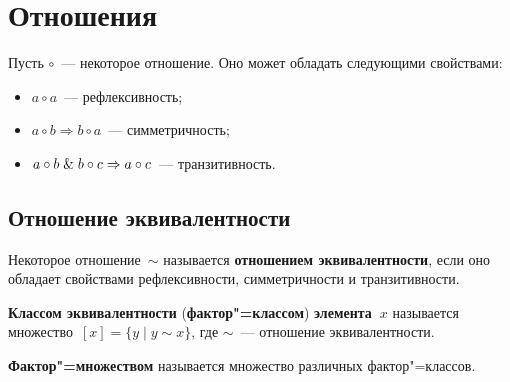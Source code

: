 \section{Отношения}
 Пусть $\circ$~--- некоторое отношение.
Оно может обладать следующими свойствами:
\begin{itemize}
	\item $a \circ a$~--- рефлексивность;
	\item $a \circ b \Rightarrow b \circ a$~--- симметричность;
	\item $a \circ b \mathrel{\&} b \circ c \Rightarrow a \circ c$~--- транзитивность.
\end{itemize}

\subsection{Отношение эквивалентности}
 Некоторое отношение~$\sim$ называется \textbf{отношением эквивалентности}, если оно обладает свойствами рефлексивности, симметричности и транзитивности.

  \textbf{Классом эквивалентности} (\textbf{фактор"=классом}) \textbf{элемента~$x$} называется множество~$[x] = \{ y \mid y \sim x \}$, где $\sim$~--- отношение эквивалентности.

 \textbf{Фактор"=множеством} называется множество различных фактор"=классов.